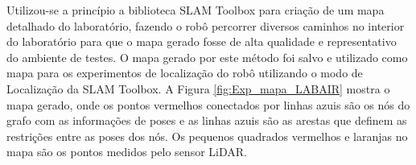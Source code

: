 

\label{Cap04}



Utilizou-se a princípio a biblioteca SLAM Toolbox para criação de um mapa detalhado do laboratório, fazendo o robô percorrer diversos caminhos no interior do laboratório para que o mapa gerado fosse de alta qualidade e representativo do ambiente de testes. O mapa gerado por este método foi salvo e utilizado como mapa para os experimentos de localização do robô utilizando o modo de Localização da SLAM Toolbox. A Figura \ref{fig:Exp_mapa_LABAIR} mostra o mapa gerado, onde os pontos vermelhos conectados por linhas azuis são os nós do grafo com as informações de poses e as linhas azuis são as arestas que definem as restrições entre as poses dos nós. Os pequenos quadrados vermelhos e laranjas no mapa são os pontos medidos pelo sensor LiDAR.

